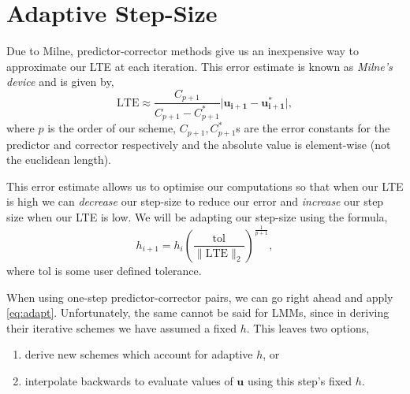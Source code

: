\documentclass[12pt, twoside]{report}
\theoremstyle{plain}
\theoremstyle{definition}
\theoremstyle{definition}
\providecommand{\abs}[1]{\lvert#1\rvert}
\providecommand{\norm}[1]{\lVert#1\rVert}
\begin{document}
    \section{Adaptive Step-Size}
    \label{2_adaptive}
        Due to Milne, predictor-corrector methods give us an inexpensive way to
        approximate our LTE at each iteration. This error estimate is known as 
        \textit{Milne's device} and is given by,
        \begin{equation}
        \label{eq:2_milnes_device}
            \text{LTE} \approx \frac{C_{p+1}}{C_{p+1} - C_{p+1}^*} 
            \abs{\mathbf{u_{i+1} - u_{i+1}^*}},
        \end{equation}
        where $p$ is the order of our scheme, $C_{p+1}, C_{p+1}^*$s are the 
        error constants for the predictor and corrector respectively and the 
        absolute value is element-wise (not the euclidean length). 

        This error estimate allows us to optimise our computations so that when
        our LTE is high we can \textit{decrease} our step-size to reduce our 
        error and \textit{increase} our step size when our LTE is low. We will be adapting our step-size using the formula,
        \begin{equation}
        \label{eq:adapt}
            h_{i+1} = h_i \left(\frac{\text{tol}} 
            {\norm{\text{LTE}}_2}\right)^{\frac{1}{p+1}},
        \end{equation}
        where $\text{tol}$ is some user defined tolerance. 

        When using one-step predictor-corrector pairs, we can go right ahead 
        and apply \eqref{eq:adapt}. Unfortunately, the same cannot be said for 
        LMMs, since in deriving their iterative schemes we have assumed a fixed
        $h$. This leaves two options,
        \begin{enumerate}[label=(\roman*)]
            \item{derive new schemes which account for adaptive $h$, or}
            \item{interpolate backwards to evaluate values of $\mathbf{u}$
            using this step's fixed $h$.}
        \end{enumerate}
\end{document}
